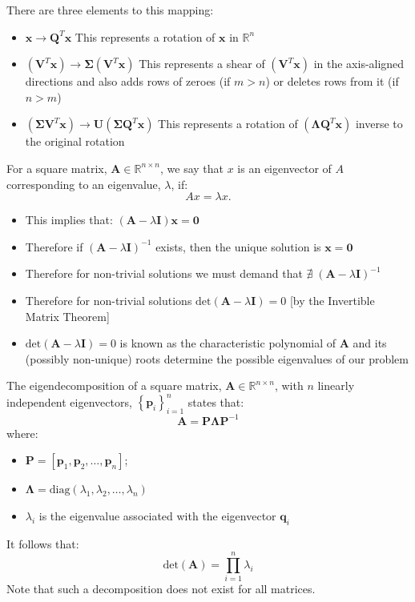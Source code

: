 There are three elements to this mapping:
\begin{itemize}
  \item $\mathbf{x} \rightarrow \mathbf{Q}^T \mathbf{x}$
     This represents a rotation of $\mathbf{x}$ in $\mathbb{R}^{n}$
   \item $(\mathbf{V}^T \mathbf{x}) \rightarrow \boldsymbol{\Sigma} (\mathbf{V}^T \mathbf{x})$    
     This represents a shear of $(\mathbf{V}^T \mathbf{x})$ in the axis-aligned
     directions and also adds rows of zeroes (if $m>n$) or deletes rows from
     it (if $n>m$)
   \item $(\boldsymbol{\Sigma} \mathbf{V}^T \mathbf{x}) \rightarrow \mathbf{U} (\boldsymbol{\Sigma} \mathbf{Q}^T \mathbf{x})$    
     This represents a rotation of $(\boldsymbol{\Lambda} \mathbf{Q}^T \mathbf{x})$ inverse to the original rotation
\end{itemize}

\begin{definition}
  For a square matrix, $\mathbf{A} \in \mathbb{R}^{n \times n}$, we say that $x$ is an
  eigenvector of $A$ corresponding to an eigenvalue, $\lambda$, if:
  \[Ax=\lambda x.\] 
  \begin{itemize}
    \item This implies that: $(\mathbf{A} - \lambda \mathbf{I})\mathbf{x} = \mathbf{0}$
    \item Therefore if ${(\mathbf{A} - \lambda \mathbf{I})}^{-1}$ exists, then the unique solution is $\mathbf{x} = \mathbf{0}$
    \item Therefore for non-trivial solutions we must demand that $\nexists \; {(\mathbf{A} - \lambda \mathbf{I})}^{-1}$
    \item Therefore for non-trivial solutions $\mbox{det}(\mathbf{A} - \lambda \mathbf{I})=0$ [by the Invertible Matrix Theorem]
    \item $\mbox{det}(\mathbf{A} - \lambda \mathbf{I})=0$ is known as the characteristic polynomial of $\mathbf{A}$ and
    its (possibly non-unique) roots determine the possible eigenvalues of our problem
  \end{itemize}
\end{definition}
\begin{definition}[Eigendecomposition]
  The eigendecomposition of a square matrix, $\mathbf{A} \in \mathbb{R}^{n \times
  n}$, with $n$ linearly independent eigenvectors, ${\left\{ \mathbf{p}_i \right\}}_{i=1}^n$ states that:
  \[\mathbf{A} = \mathbf{P} \boldsymbol{\Lambda} \mathbf{P}^{-1}\]
  where:
  \begin{itemize}
    \item $\mathbf{P} = [\mathbf{p}_1, \mathbf{p}_2,\ldots,\mathbf{p}_n]$;
    \item $\boldsymbol{\Lambda} = \mbox{diag}(\lambda_1, \lambda_2,\ldots,\lambda_n)$ 
    \item $\lambda_{i}$ is the eigenvalue associated with the eigenvector $\mathbf{q}_i$	
  \end{itemize}
  It follows that:
  \[\mbox{det}(\mathbf{A}) = \prod_{i=1}^n \lambda_i\]
  Note that such a decomposition does not exist for all matrices.
\end{definition}
